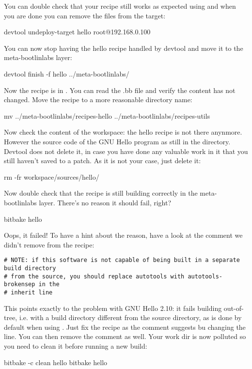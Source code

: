 You can double check that your recipe still works as expected using
 and when you are done you can remove the files
from the target:
\begin{bashinput}
devtool undeploy-target hello root@192.168.0.100
\end{bashinput}

You can now stop having the hello recipe handled by devtool and move it to
the meta-bootlinlabs layer:
\begin{bashinput}
devtool finish -f hello ../meta-bootlinlabs/
\end{bashinput}

Now the recipe is in
. You can read
the .bb file and verify the content has not changed. Move the recipe to a
more reasonable directory name:
\begin{bashinput}
mv ../meta-bootlinlabs/recipes-hello ../meta-bootlinlabs/recipes-utils
\end{bashinput}

Now check the content of the workspace: the hello recipe is not there
anynmore. However the source code of the GNU Hello program as still in the
 directory. Devtool does not delete it, in
case you have done any valuable work in it that you still haven't saved to
a patch. As it is not your case, just delete it:
\begin{bashinput}
rm -fr workspace/sources/hello/
\end{bashinput}

Now double check that the recipe is still building correctly in the
meta-bootlinlabs layer. There's no reason it should fail, right?
\begin{bashinput}
bitbake hello
\end{bashinput}

Oops, it failed! To have a hint about the reason, have a look at the
comment we didn't remove from the recipe:
\begin{verbatim}
# NOTE: if this software is not capable of being built in a separate build directory
# from the source, you should replace autotools with autotools-brokensep in the
# inherit line
\end{verbatim}

This points exactly to the problem with GNU Hello 2.10: it fails building
out-of-tree, i.e. with a build directory different from the source
directory, as is done by default when using . Just
fix the recipe as the comment suggests bu changing the 
line. You can then remove the comment as well. Your work dir is now
polluted so you need to clean it before running a new build:
\begin{bashinput}
bitbake -c clean hello
bitbake hello
\end{bashinput}

